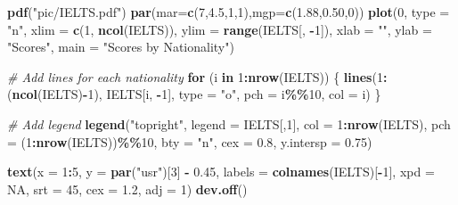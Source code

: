 \documentclass[12pt]{article}
\newenvironment{Shaded}{\begin{snugshade}}{\end{snugshade}}
\newcommand{\AttributeTok}[1]{\textcolor[rgb]{0.13,0.29,0.53}{#1}}
\newcommand{\CommentTok}[1]{\textcolor[rgb]{0.56,0.35,0.01}{\textit{#1}}}
\newcommand{\ConstantTok}[1]{\textcolor[rgb]{0.56,0.35,0.01}{#1}}
\newcommand{\ControlFlowTok}[1]{\textcolor[rgb]{0.13,0.29,0.53}{\textbf{#1}}}
\newcommand{\DecValTok}[1]{\textcolor[rgb]{0.00,0.00,0.81}{#1}}
\newcommand{\FloatTok}[1]{\textcolor[rgb]{0.00,0.00,0.81}{#1}}
\newcommand{\FunctionTok}[1]{\textcolor[rgb]{0.13,0.29,0.53}{\textbf{#1}}}
\newcommand{\NormalTok}[1]{#1}
\newcommand{\SpecialCharTok}[1]{\textcolor[rgb]{0.81,0.36,0.00}{\textbf{#1}}}
\newcommand{\StringTok}[1]{\textcolor[rgb]{0.31,0.60,0.02}{#1}}
\begin{document}
\begin{Shaded}
\begin{Highlighting}[]
\FunctionTok{pdf}\NormalTok{(}\StringTok{"pic/IELTS.pdf"}\NormalTok{)}
\FunctionTok{par}\NormalTok{(}\AttributeTok{mar=}\FunctionTok{c}\NormalTok{(}\DecValTok{7}\NormalTok{,}\FloatTok{4.5}\NormalTok{,}\DecValTok{1}\NormalTok{,}\DecValTok{1}\NormalTok{),}\AttributeTok{mgp=}\FunctionTok{c}\NormalTok{(}\FloatTok{1.88}\NormalTok{,}\FloatTok{0.50}\NormalTok{,}\DecValTok{0}\NormalTok{))}
\FunctionTok{plot}\NormalTok{(}\DecValTok{0}\NormalTok{, }\AttributeTok{type =} \StringTok{"n"}\NormalTok{, }\AttributeTok{xlim =} \FunctionTok{c}\NormalTok{(}\DecValTok{1}\NormalTok{, }\FunctionTok{ncol}\NormalTok{(IELTS)), }\AttributeTok{ylim =} \FunctionTok{range}\NormalTok{(IELTS[, }\SpecialCharTok{{-}}\DecValTok{1}\NormalTok{]),}
     \AttributeTok{xlab =} \StringTok{""}\NormalTok{, }\AttributeTok{ylab =} \StringTok{"Scores"}\NormalTok{, }\AttributeTok{main =} \StringTok{"Scores by Nationality"}\NormalTok{)}

\CommentTok{\# Add lines for each nationality}
\ControlFlowTok{for}\NormalTok{ (i }\ControlFlowTok{in} \DecValTok{1}\SpecialCharTok{:}\FunctionTok{nrow}\NormalTok{(IELTS)) \{}
  \FunctionTok{lines}\NormalTok{(}\DecValTok{1}\SpecialCharTok{:}\NormalTok{(}\FunctionTok{ncol}\NormalTok{(IELTS)}\SpecialCharTok{{-}}\DecValTok{1}\NormalTok{), IELTS[i, }\SpecialCharTok{{-}}\DecValTok{1}\NormalTok{], }\AttributeTok{type =} \StringTok{"o"}\NormalTok{, }\AttributeTok{pch =}\NormalTok{ i}\SpecialCharTok{\%\%}\DecValTok{10}\NormalTok{, }\AttributeTok{col =}\NormalTok{ i)}
\NormalTok{\}}

\CommentTok{\# Add legend}
\FunctionTok{legend}\NormalTok{(}\StringTok{"topright"}\NormalTok{, }\AttributeTok{legend =}\NormalTok{ IELTS[,}\DecValTok{1}\NormalTok{], }\AttributeTok{col =} \DecValTok{1}\SpecialCharTok{:}\FunctionTok{nrow}\NormalTok{(IELTS), }\AttributeTok{pch =}\NormalTok{ (}\DecValTok{1}\SpecialCharTok{:}\FunctionTok{nrow}\NormalTok{(IELTS))}\SpecialCharTok{\%\%}\DecValTok{10}\NormalTok{, }
       \AttributeTok{bty =} \StringTok{"n"}\NormalTok{, }\AttributeTok{cex =} \FloatTok{0.8}\NormalTok{, }\AttributeTok{y.intersp =} \FloatTok{0.75}\NormalTok{)}

\FunctionTok{text}\NormalTok{(}\AttributeTok{x =} \DecValTok{1}\SpecialCharTok{:}\DecValTok{5}\NormalTok{,}
     \AttributeTok{y =} \FunctionTok{par}\NormalTok{(}\StringTok{"usr"}\NormalTok{)[}\DecValTok{3}\NormalTok{] }\SpecialCharTok{{-}} \FloatTok{0.45}\NormalTok{,}
     \AttributeTok{labels =} \FunctionTok{colnames}\NormalTok{(IELTS)[}\SpecialCharTok{{-}}\DecValTok{1}\NormalTok{],}
     \AttributeTok{xpd =} \ConstantTok{NA}\NormalTok{,}
     \AttributeTok{srt =} \DecValTok{45}\NormalTok{,}
     \AttributeTok{cex =} \FloatTok{1.2}\NormalTok{,}
     \AttributeTok{adj =} \DecValTok{1}\NormalTok{)}
\FunctionTok{dev.off}\NormalTok{()}
\end{Highlighting}
\end{Shaded}
\end{document}
